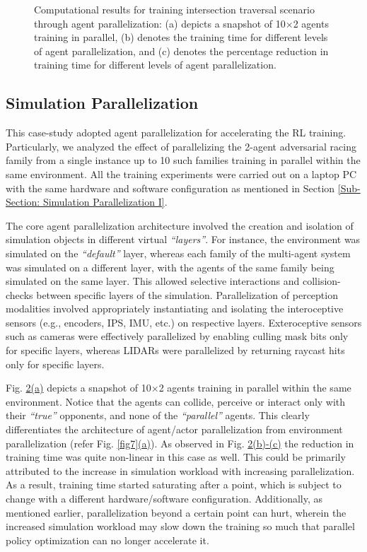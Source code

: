 \documentclass[letterpaper, 10 pt, conference]{ieeeconf}  %
\begin{document}
\begin{figure}[t]
\begin{subfigure}[b]{0.32\linewidth}
			\caption{}
			\label{fig11c}
		\end{subfigure}
		\caption{Computational results for training intersection traversal scenario through agent parallelization: (a) depicts a snapshot of 10$\times$2 agents training in parallel, (b) denotes the training time for different levels of agent parallelization, and (c) denotes the percentage reduction in training time for different levels of agent parallelization.}
		\label{fig11}
	\end{figure}
	
	\subsection{Simulation Parallelization}
	\label{Sub-Section: Simulation Parallelization II}
	
	This case-study adopted agent parallelization for accelerating the RL training. Particularly, we analyzed the effect of parallelizing the 2-agent adversarial racing family from a single instance up to 10 such families training in parallel within the same environment. All the training experiments were carried out on a laptop PC with the same hardware and software configuration as mentioned in Section \ref{Sub-Section: Simulation Parallelization I}.
	
	The core agent parallelization architecture involved the creation and isolation of simulation objects in different virtual \textit{``layers''}. For instance, the environment was simulated on the \textit{``default''} layer, whereas each family of the multi-agent system was simulated on a different layer, with the agents of the same family being simulated on the same layer. This allowed selective interactions and collision-checks between specific layers of the simulation. Parallelization of perception modalities involved appropriately instantiating and isolating the interoceptive sensors (e.g., encoders, IPS, IMU, etc.) on respective layers. Exteroceptive sensors such as cameras were effectively parallelized by enabling culling mask bits only for specific layers, whereas LIDARs were parallelized by returning raycast hits only for specific layers.
	
	Fig. \hyperref[fig11]{\ref*{fig11}(a)} depicts a snapshot of 10$\times$2 agents training in parallel within the same environment. Notice that the agents can collide, perceive or interact only with their \textit{``true''} opponents, and none of the \textit{``parallel''} agents. This clearly differentiates the architecture of agent/actor parallelization from environment parallelization (refer Fig. \hyperref[fig7]{\ref*{fig7}(a)}). As observed in Fig. \hyperref[fig11]{\ref*{fig11}(b)-(c)} the reduction in training time was quite non-linear in this case as well. This could be primarily attributed to the increase in simulation workload with increasing parallelization. As a result, training time started saturating after a point, which is subject to change with a different hardware/software configuration. Additionally, as mentioned earlier, parallelization beyond a certain point can hurt, wherein the increased simulation workload may slow down the training so much that parallel policy optimization can no longer accelerate it.
	
\end{document}

